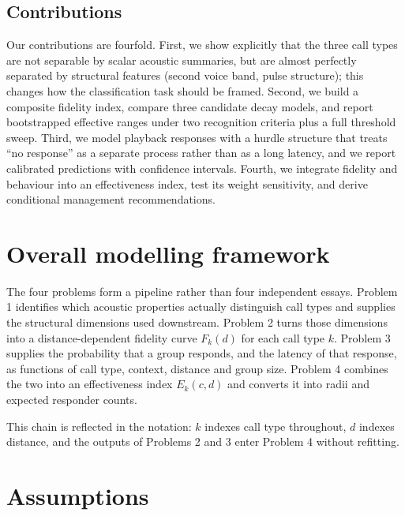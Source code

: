 \documentclass{apmcmthesis}
\begin{document}
\subsection{Contributions}
Our contributions are fourfold. First, we show explicitly that the three call types are not
separable by scalar acoustic summaries, but are almost perfectly separated by structural
features (second voice band, pulse structure); this changes how the classification task should
be framed. Second, we build a composite fidelity index, compare three candidate decay models,
and report bootstrapped effective ranges under two recognition criteria plus a full threshold
sweep. Third, we model playback responses with a hurdle structure that treats ``no response''
as a separate process rather than as a long latency, and we report calibrated predictions with
confidence intervals. Fourth, we integrate fidelity and behaviour into an effectiveness index,
test its weight sensitivity, and derive conditional management recommendations.

\section{Overall modelling framework}

The four problems form a pipeline rather than four independent essays.
Problem 1 identifies which acoustic properties actually distinguish call types and supplies the
structural dimensions used downstream. Problem 2 turns those dimensions into a
distance-dependent fidelity curve $F_k(d)$ for each call type $k$. Problem 3 supplies the
probability that a group responds, and the latency of that response, as functions of call type,
context, distance and group size. Problem 4 combines the two into an effectiveness index
$E_k(c,d)$ and converts it into radii and expected responder counts.

This chain is reflected in the notation: $k$ indexes call type throughout, $d$ indexes distance,
and the outputs of Problems 2 and 3 enter Problem 4 without refitting.

\section{Assumptions}
\end{document}
